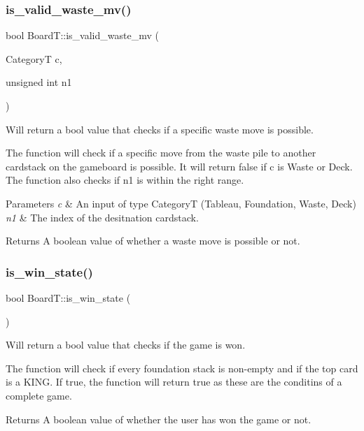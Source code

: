 \subsubsection{\texorpdfstring{is\+\_\+valid\+\_\+waste\+\_\+mv()}{is\_valid\_waste\_mv()}}
{\footnotesize\ttfamily bool Board\+T\+::is\+\_\+valid\+\_\+waste\+\_\+mv (\begin{DoxyParamCaption}\item[{CategoryT}]{c,  }\item[{unsigned int}]{n1 }\end{DoxyParamCaption})}



Will return a bool value that checks if a specific waste move is possible. 

The function will check if a specific move from the waste pile to another cardstack on the gameboard is possible. It will return false if c is Waste or Deck. The function also checks if n1 is within the right range. 
\begin{DoxyParams}{Parameters}
{\em c} & An input of type CategoryT (Tableau, Foundation, Waste, Deck) \\
\hline
{\em n1} & The index of the desitnation cardstack. \\
\hline
\end{DoxyParams}
\begin{DoxyReturn}{Returns}
A boolean value of whether a waste move is possible or not. 
\end{DoxyReturn}
\mbox{\label{class_board_t_a163bed593a3f0ba24dd5401b595b75cd}} 
\subsubsection{\texorpdfstring{is\+\_\+win\+\_\+state()}{is\_win\_state()}}
{\footnotesize\ttfamily bool Board\+T\+::is\+\_\+win\+\_\+state (\begin{DoxyParamCaption}{ }\end{DoxyParamCaption})}



Will return a bool value that checks if the game is won. 

The function will check if every foundation stack is non-\/empty and if the top card is a K\+I\+NG. If true, the function will return true as these are the conditins of a complete game. \begin{DoxyReturn}{Returns}
A boolean value of whether the user has won the game or not. 
\end{DoxyReturn}
\mbox{\label{class_board_t_a0c55adc3925fe48ae0672d29d975aac4}} 
